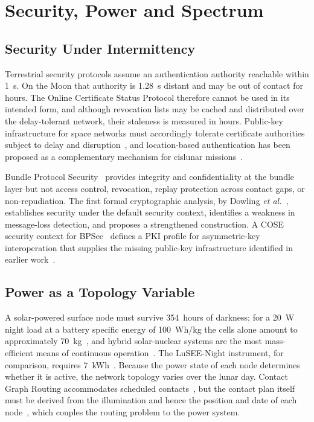 \documentclass[11pt,a4paper]{article}
\begin{document}
\section{Security, Power and Spectrum}
\label{sec:spectrum}

\subsection{Security Under Intermittency}
Terrestrial security protocols assume an authentication authority reachable within \SI{1}{\second}. On the Moon that authority is \SI{1.28}{\second} distant and may be out of contact for hours. The Online Certificate Status Protocol therefore cannot be used in its intended form, and although revocation lists may be cached and distributed over the delay-tolerant network, their staleness is measured in hours. Public-key infrastructure for space networks must accordingly tolerate certificate authorities subject to delay and disruption~\cite{foerster_pki,koisser_pki_space}, and location-based authentication has been proposed as a complementary mechanism for cislunar missions~\cite{jedermann_location_auth}.

Bundle Protocol Security~\cite{rfc9172} provides integrity and confidentiality at the bundle layer but not access control, revocation, replay protection across contact gaps, or non-repudiation. The first formal cryptographic analysis, by Dowling \emph{et al.}~\cite{dowling_bpsec}, establishes security under the default security context, identifies a weakness in message-loss detection, and proposes a strengthened construction. A COSE security context for BPSec~\cite{bpsec_cose} defines a PKI profile for asymmetric-key interoperation that supplies the missing public-key infrastructure identified in earlier work~\cite{foerster_pki,koisser_pki_space}.

\subsection{Power as a Topology Variable}
A solar-powered surface node must survive \SI{354}{hours} of darkness; for a \SI{20}{W} night load at a battery specific energy of \SI{100}{Wh/kg} the cells alone amount to approximately \SI{70}{kg}~\cite{colozza_power1991}, and hybrid solar-nuclear systems are the most mass-efficient means of continuous operation~\cite{balat_power2021}. The LuSEE-Night instrument, for comparison, requires \SI{7}{kWh}~\cite{aguirre_lusee}. Because the power state of each node determines whether it is active, the network topology varies over the lunar day. Contact Graph Routing accommodates scheduled contacts~\cite{burleigh_cgr}, but the contact plan itself must be derived from the illumination and hence the position and date of each node~\cite{fraire_contact_plan}, which couples the routing problem to the power system.
\end{document}
